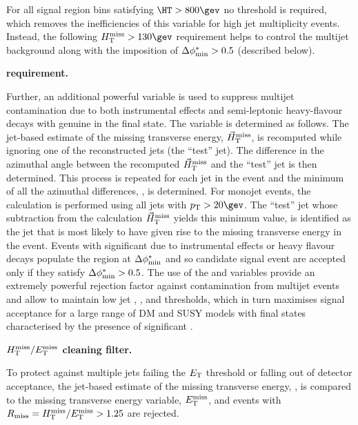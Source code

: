 For all signal region bins satisfying $\HT > 800\gev$  no \alphat
threshold is required, which removes the inefficiencies of this
variable for high jet multiplicity events. Instead, the following
$\mht >130\gev$ requirement helps to control the multijet background
along with the imposition of $\mbox{$\Delta\phi^{*}_{\rm min}$} > 0.5$ (described below).

{\bf \bdphi requirement.} 

Further, an additional powerful variable \bdphi is used to suppress
multijet contamination due to both instrumental effects and
semi-leptonic heavy-flavour decays with genuine \met in the final
state. The variable is determined as follows. The jet-based estimate
of the missing transverse energy, ${\mbox{$\vec{H}_{\rm T}^{\rm miss}$}}$, is recomputed while
ignoring one of the reconstructed jets (the ``test'' jet). The
difference in the azimuthal angle between the recomputed $\mbox{$\vec{H}_{\rm T}^{\rm miss}$}$
and the ``test'' jet is then determined. This process is repeated for
each jet in the event and the minimum of all the azimuthal
differences, \bdphi, is determined. For monojet events, the calculation is 
performed using all jets with $\Pt > 20\gev$. The ``test'' jet whose subtraction
from the calculation $\mbox{$\vec{H}_{\rm T}^{\rm miss}$}$ yields this minimum value, is
identified as the jet that is most likely to have given rise to the
missing transverse energy in the event. Events with significant \mht
due to instrumental effects or heavy flavour decays populate the
region at $\mbox{$\Delta\phi^{*}_{\rm min}$}$ and so candidate signal event are accepted
only if they satisfy $\mbox{$\Delta\phi^{*}_{\rm min}$} > 0.5$. The use of the \bdphi and \alphat
variables provide an extremely powerful rejection factor against
contamination from multijet events and allow to maintain low jet \PT,
\HT, and \mht thresholds, which in turn maximises signal acceptance
for a large range of DM and SUSY models with final states
characterised by the presence of significant \met.

{\bf $\mbox{$H_{\rm T}^{\rm miss}$}/\mbox{$E_\text{T}^{\rm miss}$}$ cleaning filter.} 

To protect against multiple jets failing the ${E_{\text T}}$ threshold or
falling out of detector acceptance, the jet-based
estimate of the missing transverse energy, \mht, is compared to the
missing transverse energy variable, $\mbox{$E_\text{T}^{\rm miss}$}$, and events with $R_{\rm
  miss}=\mbox{$H_{\rm T}^{\rm miss}$}/\mbox{$E_\text{T}^{\rm miss}$} > 1.25$ are rejected.
  

